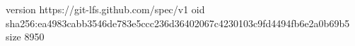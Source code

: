 version https://git-lfs.github.com/spec/v1
oid sha256:ea4983cabb3546de783e5ccc236d36402067c4230103c9fd4494fb6e2a0b69b5
size 8950
